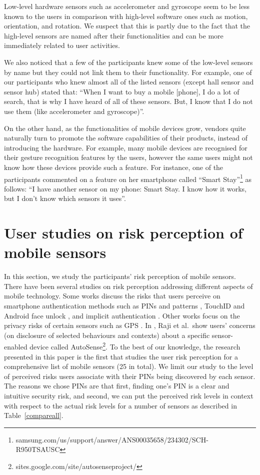 \documentclass[10pt,twocolumn]{article}
\begin{document}
Low-level hardware sensors such as accelerometer and gyroscope seem to be less known to the users in comparison with high-level software ones such as motion, orientation, and rotation. We suspect that this is partly due to the fact that the high-level sensors are named after their functionalities and can be more immediately related to user activities. 

We also noticed that a few of the participants knew some of the low-level sensors by name but they could not link them to their functionality. For example, one of our participants who knew almost all of the listed sensors (except hall sensor and sensor hub) stated that: ``When I want to buy a mobile [phone], I do a lot of search, that is why I have heard of all of these sensors. But, I know that I do not use them (like accelerometer and gyroscope)''. 

On the other hand, as the functionalities of mobile devices grow, vendors quite naturally turn to promote the software capabilities of their products, instead of introducing the hardware. For example, many mobile devices are recognised for their gesture recognition features by the users, however the same users might not know how these devices provide such a feature. For instance, one of the participants commented on a feature on her smartphone called ``Smart Stay''\footnote{samsung.com/us/support/answer/ANS00035658/234302/SCH-R950TSAUSC} as follows: ``I have another sensor on my phone: Smart Stay. I know how it works, but I don't know which sensors it uses''. 


\section{User studies on risk perception of mobile sensors}
In this section, we study the participants' risk perception of mobile sensors. 
There have been several studies on risk perception addressing different aspects of mobile technology.  
Some works discuss the risks that users perceive on smartphone authentication methods such as PINs and patterns \cite{smart}, TouchID and Android face unlock \cite{au}, and implicit authentication \cite{impil}. Other works focus on the privacy risks of certain sensors such as GPS \cite{brothers}. 
In \cite{Raij}, Raji et al.~show users' concerns (on disclosure of selected behaviours and
contexts) about a specific sensor-enabled device called AutoSense\footnote{sites.google.com/site/autosenseproject/}. 
To the best of our knowledge, the research presented in this paper is the first that studies the user risk perception for a comprehensive list of mobile sensors (25 in total). We limit our study to the level of perceived risks users associate with their PINs being discovered by each sensor. The reasons we chose PINs are that first, finding one's PIN is a clear and intuitive security risk, and second, we can put the perceived risk levels in context with respect to the actual risk levels for a number of sensors as described in Table~\ref{compareall}.  
\end{document}
